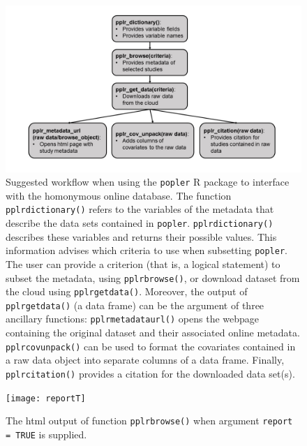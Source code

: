 \documentclass{article}\usepackage[]{graphicx}\usepackage[]{color}
\begin{document}
\newpage
\begin{figure}[h!]
  \begin{center}
    \includegraphics[scale=0.4]{pack_funs}
    \caption{Suggested workflow when using the \texttt{popler} R package to interface with the homonymous online database. The function \texttt{pplr\textunderscore dictionary()} refers to the variables of the metadata that describe the data sets contained in \texttt{popler}. \texttt{pplr\textunderscore dictionary()} describes these variables and returns their possible values. This information advises which criteria to use when subsetting \texttt{popler}. The user can provide a criterion (that is, a logical statement) to subset the metadata, using \texttt{pplr\textunderscore browse()}, or download dataset from the cloud using \texttt{pplr\textunderscore get\textunderscore data()}. Moreover, the output of \texttt{pplr\textunderscore get\textunderscore data()} (a data frame) can be the argument of three ancillary functions: \texttt{pplr\textunderscore metadata\textunderscore url()} opens the webpage containing the original dataset and their associated online metadata. \texttt{pplr\textunderscore cov\textunderscore unpack()} can be used to format the covariates contained in a raw data object into separate columns of a data frame. Finally, \texttt{pplr\textunderscore citation()} provides a citation for the downloaded data set(s).}
    \label{Fig:pack_funs}
  \end{center}
\end{figure}

\newpage
\begin{figure}[h!]
  \begin{center}
    \texttt{[image: reportT]}
    \caption{The html output of function \texttt{pplr\textunderscore browse()} when argument \texttt{report = TRUE} is supplied.}
    \label{Fig:reportT}
  \end{center}
\end{figure}
\end{document}
